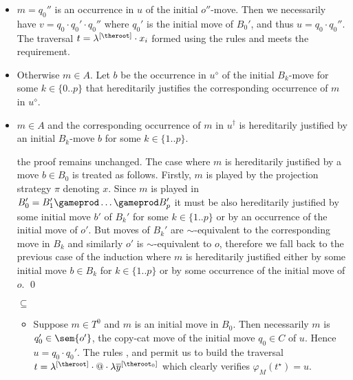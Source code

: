 \begin{itemize}[$\bullet$]
\begin{description}
\begin{itemize}
            \item $m = q_0''$ is an occurrence in $u$ of the initial $o''$-move. Then we necessarily have $v = q_0 \cdot q_0' \cdot q_0''$ where $q_0'$ is the initial move of $B_0'$, and thus $u = q_0 \cdot q_0''$. The traversal $t = \lambda^{[\theroot]} \cdot x_i$ formed using the rules  and  meets the requirement.


            \item Otherwise $m \in A$. Let $b$ be the occurrence in $u^\diamond$ of the initial $B_k$-move for some $k\in \{0..p\}$ that hereditarily justifies the corresponding occurrence of $m$ in $u^\diamond$.



            \item $m \in A$ and the corresponding occurrence of $m$ in $u^\dagger$ is hereditarily justified by an initial $B_k$-move $b$ for some $k\in \{1..p\}$.


                the proof remains unchanged. The case where $m$ is hereditarily justified by a move $b \in B_0$ is treated as follows. Firstly, $m$ is played by the projection strategy $\pi$ denoting $x$.
             Since $m$ is played in $B_0' = B_1' \gameprod \ldots \gameprod B_p'$ it must be also hereditarily justified by some initial move $b'$ of $B_k'$ for some $k \in \{1.. p\}$ or by an occurrence of the initial move of $o'$. But moves of $B_k'$ are $\sim$-equivalent to the corresponding move in $B_k$ and similarly $o'$ is $\sim$-equivalent to $o$, therefore we fall back to the previous case of the induction where $m$ is hereditarily justified either by some initial move $b\in B_k$ for $k\in \{1..p\}$ or by some occurrence of the initial move of $o$.
    \qed

        \end{itemize}

    \end{description}
    
    
    
    
    {


\begin{enumerate}
\item[$\subseteq$]
    \begin{itemize}

    \item Suppose $m\in T^0$ and $m$ is an initial move in $B_0$.
    Then necessarily $m$ is $q_0' \in \sem{o'}$, the copy-cat move of the initial move $q_0 \in C$ of $u$. Hence $u = q_0 \cdot q_0'$. The rules , 
and  permit us to build the traversal $t =
\lambda^{[\theroot]} \cdot @ \cdot \lambda
\overline{y}^{[\theroot_0]}$ which clearly verifies
$\varphi_M(t^\star) = u$.


\end{itemize}
\end{enumerate}}
\end{itemize}
